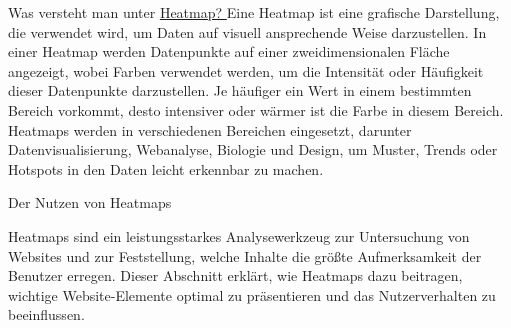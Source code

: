 Was versteht man unter \href{https://itweb.at/glossar/heatmap/}{Heatmap? }
Eine Heatmap ist eine grafische Darstellung, die verwendet wird, um Daten auf visuell ansprechende Weise darzustellen. In einer Heatmap werden Datenpunkte auf einer zweidimensionalen Fläche angezeigt, wobei Farben verwendet werden, um die Intensität oder Häufigkeit dieser Datenpunkte darzustellen. Je häufiger ein Wert in einem bestimmten Bereich vorkommt, desto intensiver oder wärmer ist die Farbe in diesem Bereich. Heatmaps werden in verschiedenen Bereichen eingesetzt, darunter Datenvisualisierung, Webanalyse, Biologie und Design, um Muster, Trends oder Hotspots in den Daten leicht erkennbar zu machen.

Der Nutzen von Heatmaps

Heatmaps sind ein leistungsstarkes Analysewerkzeug zur Untersuchung von Websites und zur Feststellung, welche Inhalte die größte Aufmerksamkeit der Benutzer erregen. Dieser Abschnitt erklärt, wie Heatmaps dazu beitragen, wichtige Website-Elemente optimal zu präsentieren und das Nutzerverhalten zu beeinflussen.
